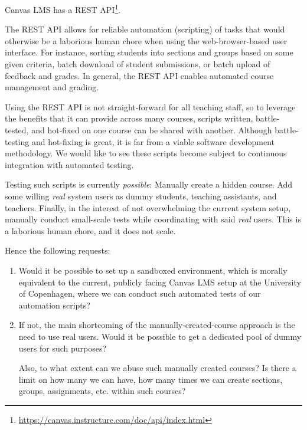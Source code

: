 \documentclass[a4paper]{article}
\begin{document}
\maketitle

\pagestyle{empty}

\bigskip

Canvas LMS has a REST
API\footnote{\url{https://canvas.instructure.com/doc/api/index.html}}.

\bigskip

The REST API allows for reliable automation (scripting) of tasks that would
otherwise be a laborious human chore when using the web-browser-based user
interface.  For instance, sorting students into sections and groups based on
some given criteria, batch download of student submissions, or batch upload of
feedback and grades. In general, the REST API enables automated course
management and grading.

Using the REST API is not straight-forward for all teaching staff, so to
leverage the benefits that it can provide across many courses, scripts written,
battle-tested, and hot-fixed on one course can be shared with another. Although
battle-testing and hot-fixing is great, it is far from a viable software
development methodology. We would like to see these scripts become subject to
continuous integration with automated testing.

Testing such scripts is currently \emph{possible}: Manually create a hidden
course. Add some willing \emph{real} system users as dummy students, teaching
assistants, and teachers. Finally, in the interest of not overwhelming the
current system setup, manually conduct small-scale tests while coordinating
with said \emph{real} users. This is a laborious human chore, and it does not
scale.

Hence the following requests:

\begin{enumerate}

\item Would it be possible to set up a sandboxed environment, which is morally
equivalent to the current, publicly facing Canvas LMS setup at the University
of Copenhagen, where we can conduct such automated tests of our automation
scripts?

\item If not, the main shortcoming of the manually-created-course approach is
the need to use real users. Would it be possible to get a dedicated pool of
dummy users for such purposes?

Also, to what extent can we abuse such manually created courses? Is there a
limit on how many we can have, how many times we can create sections, groups,
assignments, etc. within such courses?

\end{enumerate}
\end{document}

